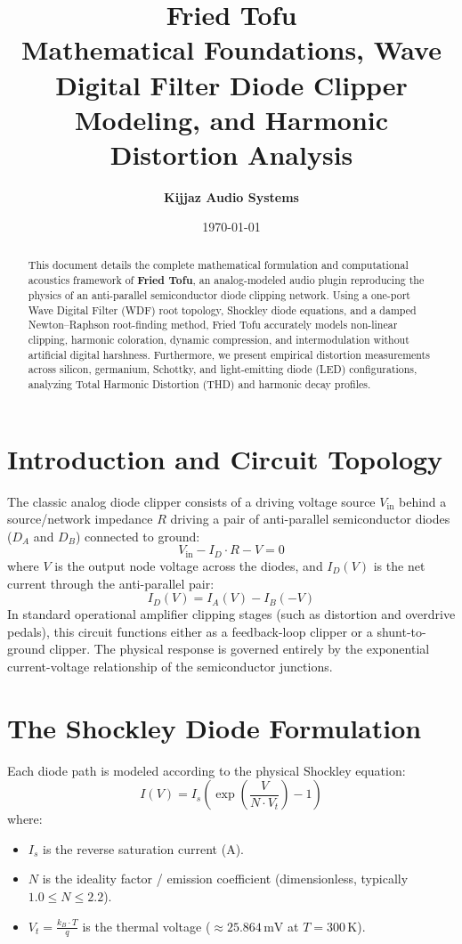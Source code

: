 \documentclass[11pt,a4paper]{article}
\title{\textbf{\Huge Fried Tofu} \\ \Large Mathematical Foundations, Wave Digital Filter Diode Clipper Modeling, and Harmonic Distortion Analysis}
\author{\textbf{Kijjaz Audio Systems}}
\date{\today}
\begin{document}
\maketitle

\begin{abstract}
This document details the complete mathematical formulation and computational acoustics framework of \textbf{Fried Tofu}, an analog-modeled audio plugin reproducing the physics of an anti-parallel semiconductor diode clipping network. Using a one-port Wave Digital Filter (WDF) root topology, Shockley diode equations, and a damped Newton--Raphson root-finding method, Fried Tofu accurately models non-linear clipping, harmonic coloration, dynamic compression, and intermodulation without artificial digital harshness. Furthermore, we present empirical distortion measurements across silicon, germanium, Schottky, and light-emitting diode (LED) configurations, analyzing Total Harmonic Distortion (THD) and harmonic decay profiles.
\end{abstract}

\section{Introduction and Circuit Topology}
The classic analog diode clipper consists of a driving voltage source $V_{\text{in}}$ behind a source/network impedance $R$ driving a pair of anti-parallel semiconductor diodes ($D_A$ and $D_B$) connected to ground:
\begin{equation}
    V_{\text{in}} - I_D \cdot R - V = 0
\end{equation}
where $V$ is the output node voltage across the diodes, and $I_D(V)$ is the net current through the anti-parallel pair:
\begin{equation}
    I_D(V) = I_A(V) - I_B(-V)
\end{equation}
In standard operational amplifier clipping stages (such as distortion and overdrive pedals), this circuit functions either as a feedback-loop clipper or a shunt-to-ground clipper. The physical response is governed entirely by the exponential current-voltage relationship of the semiconductor junctions.

\section{The Shockley Diode Formulation}
Each diode path is modeled according to the physical Shockley equation:
\begin{equation}
    I(V) = I_s \left( \exp\left( \frac{V}{N \cdot V_t} \right) - 1 \right)
\end{equation}
where:
\begin{itemize}
    \item $I_s$ is the reverse saturation current ($\text{A}$).
    \item $N$ is the ideality factor / emission coefficient (dimensionless, typically $1.0 \le N \le 2.2$).
    \item $V_t = \frac{k_B \cdot T}{q}$ is the thermal voltage ($\approx 25.864\,\text{mV}$ at $T = 300\,\text{K}$).
\end{itemize}
\end{document}
